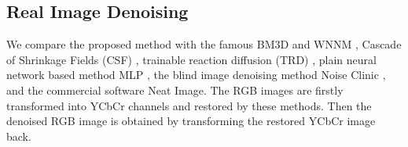 \documentclass[10pt,twocolumn,letterpaper]{article}
\begin{document}
\subsection{Real Image Denoising}
We compare the proposed method with the famous BM3D \cite{bm3d} and WNNM \cite{wnnm}, Cascade of Shrinkage Fields (CSF) \cite{csf}, trainable reaction diffusion (TRD) \cite{chen2015learning}, plain neural network based method MLP \cite{burger2012image}, the blind image denoising method Noise Clinic \cite{noiseclinic}, and the commercial software Neat Image. The RGB images are firstly transformed into YCbCr channels and restored by these methods. Then the denoised RGB image is obtained by transforming the restored YCbCr image back.
\begin{figure}
\centering
{}
\end{figure}
\end{document}
